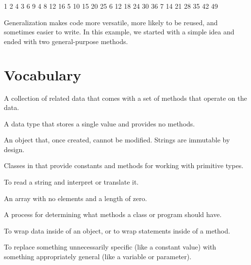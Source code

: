 \begin{stdout}
   1
   2   4
   3   6   9
   4   8  12  16
   5  10  15  20  25
   6  12  18  24  30  36
   7  14  21  28  35  42  49
\end{stdout}

Generalization makes code more versatile, more likely to be reused, and sometimes easier to write.
In this example, we started with a simple idea and ended with two general-purpose methods.




\section{Vocabulary}

\begin{description}

A collection of related data that comes with a set of methods that operate on the data.

A data type that stores a single value and provides no methods.

An object that, once created, cannot be modified.
Strings are immutable by design.

Classes in  that provide constants and methods for working with primitive types.

To read a string and interpret or translate it.

An array with no elements and a length of zero.

A process for determining what methods a class or program should have.

To wrap data inside of an object, or to wrap statements inside of a method.

To replace something unnecessarily specific (like a constant value) with something appropriately general (like a variable or parameter).

\end{description}


